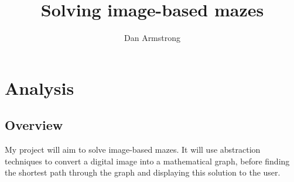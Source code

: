\documentclass[titlepage]{article}
\author{Dan Armstrong}
\title{Solving image-based mazes}
\begin{document}
\maketitle
\tableofcontents
\pagebreak
\section{Analysis}

\subsection{Overview}
My project will aim to solve image-based mazes. It will use abstraction techniques to convert a digital image into a mathematical graph, before finding the shortest path through the graph and displaying this solution to the user.
\end{document}
